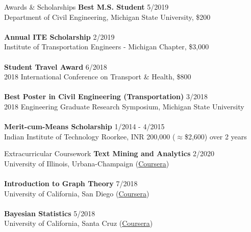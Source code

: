 \documentclass{res} %
\begin{document}
    \begin{rSection}{Awards \& Scholarships}
        \textbf{Best M.S. Student} \hfill {5/2019}
        \\ Department of Civil Engineering, Michigan State University, \$200 \\
        \\ \textbf{Annual ITE Scholarship} \hfill {2/2019}
        \\ Institute of Transportation Engineers - Michigan Chapter, \$3,000 \\
        \\ \textbf{Student Travel Award} \hfill {6/2018}
        \\ 2018 International Conference on Transport \& Health, \$800 \\
        \\ \textbf{Best Poster in Civil Engineering (Transportation)} \hfill{3/2018}
        \\ 2018 Engineering Graduate Research Symposium, Michigan State University \\
        \\ \textbf{Merit-cum-Means Scholarship} \hfill{1/2014 - 4/2015}
        \\ Indian Institute of Technology Roorkee, INR 200,000 ($\approx$\$2,600) over 2 years
    \end{rSection}

    \begin{rSection}{Extracurricular Coursework}
        \textbf{Text Mining and Analytics} \hfill 2/2020
        \\ University of Illinois, Urbana-Champaign (\href{https://coursera.org/share/7eac25e880771bf576b661324a4d79be}{Coursera}) \\
        \\ \textbf{Introduction to Graph Theory} \hfill 7/2018
        \\ University of California, San Diego (\href{https://coursera.org/share/97583460aa0510f570f971844f19d16b}{Coursera}) \\
        \\ \textbf{Bayesian Statistics} \hfill 5/2018
        \\ University of California, Santa Cruz (\href{https://coursera.org/share/8d0b0387400c53f13a7ce2b2b81153fc}{Coursera})
    \end{rSection}
\end{document}
